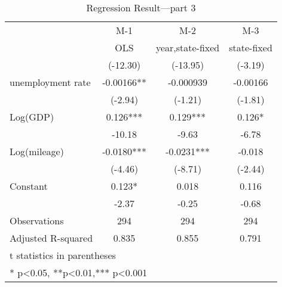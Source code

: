 \clearpage
\begin{table}[htbp]
    \centering
    \caption{Regression Result---part 3}
    \begin{tabular}{p{7.355em}lll}
        \toprule
        \multicolumn{1}{c}{} & \multicolumn{1}{c}{M-1}        & \multicolumn{1}{c}{M-2}              & \multicolumn{1}{c}{M-3}         \\
        \multicolumn{1}{c}{} & \multicolumn{1}{c}{OLS}        & \multicolumn{1}{c}{year,state-fixed} & \multicolumn{1}{c}{state-fixed} \\
        \midrule
        \multicolumn{1}{c}{} & \multicolumn{1}{c}{(-12.30)}   & \multicolumn{1}{c}{(-13.95)}         & \multicolumn{1}{c}{(-3.19)}     \\
        unemployment rate    & \multicolumn{1}{c}{-0.00166**} & \multicolumn{1}{c}{-0.000939}        & \multicolumn{1}{c}{-0.00166}    \\
        \multicolumn{1}{c}{} & \multicolumn{1}{c}{(-2.94)}    & \multicolumn{1}{c}{(-1.21)}          & \multicolumn{1}{c}{(-1.81)}     \\
        Log(GDP)             & \multicolumn{1}{c}{0.126***}   & \multicolumn{1}{c}{0.129***}         & \multicolumn{1}{c}{0.126*}      \\
        \multicolumn{1}{c}{} & \multicolumn{1}{c}{-10.18}     & \multicolumn{1}{c}{-9.63}            & \multicolumn{1}{c}{-6.78}       \\
        Log(mileage)         & \multicolumn{1}{c}{-0.0180***} & \multicolumn{1}{c}{-0.0231***}       & \multicolumn{1}{c}{-0.018}      \\
        \multicolumn{1}{c}{} & \multicolumn{1}{c}{(-4.46)}    & \multicolumn{1}{c}{(-8.71)}          & \multicolumn{1}{c}{(-2.44)}     \\
        Constant             & \multicolumn{1}{c}{0.123*}     & \multicolumn{1}{c}{0.018}            & \multicolumn{1}{c}{0.116}       \\
        \multicolumn{1}{c}{} & \multicolumn{1}{c}{-2.37}      & \multicolumn{1}{c}{-0.25}            & \multicolumn{1}{c}{-0.68}       \\
        \midrule
        Observations         & \multicolumn{1}{c}{294}        & \multicolumn{1}{c}{294}              & \multicolumn{1}{c}{294}         \\
        Adjusted R-squared   & \multicolumn{1}{c}{0.835}      & \multicolumn{1}{c}{0.855}            & \multicolumn{1}{c}{0.791}       \\
        \midrule
        \multicolumn{4}{p{24.71em}}{t statistics in parentheses}                                                                       \\
        \multicolumn{4}{p{24.71em}}{* p<0.05, **p<0.01,*** p<0.001}                                                                    \\
        \bottomrule
    \end{tabular}%
    \label{Table 2.9}%
\end{table}%
